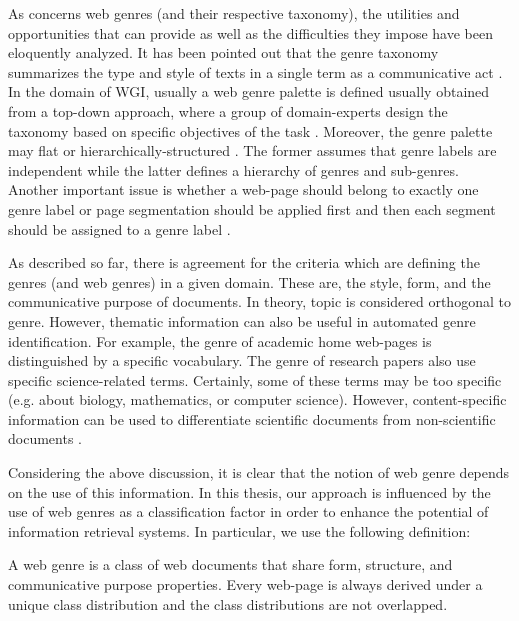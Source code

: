 As concerns web genres (and their respective taxonomy), the utilities and opportunities that can provide as well as the difficulties they impose have been eloquently analyzed. It has been pointed out that the genre taxonomy summarizes the type and style of texts in a single term as a communicative act \parencite{de2009genre}. In the domain of WGI, usually a web genre palette is defined usually obtained from a top-down approach, where a group of domain-experts design the taxonomy based on specific objectives of the task \parencite{crowston2011problems}. Moreover, the genre palette may flat or hierarchically-structured \parencite{wu2010fine}. The former assumes that genre labels are independent while the latter defines a hierarchy of genres and sub-genres. Another important issue is whether a web-page should belong to exactly one genre label or page segmentation should be applied first and then each segment should be assigned to a genre label  \parencite{madjarov2015web,jebari2015combination}. 

As described so far, there is agreement for the criteria which are defining the genres (and web genres) in a given domain. These are, the style, form, and the communicative purpose of documents. In theory, topic is considered orthogonal to genre. However, thematic information can also be useful in automated genre identification. For example, the genre of academic home web-pages is distinguished by a specific vocabulary. The genre of research papers also use specific science-related terms. Certainly, some of these terms may be too specific (e.g. about biology, mathematics, or computer science). However, content-specific information can be used to differentiate scientific documents from non-scientific documents \parencite{coutinho2009describe,crowston2011problems,kanaris2009learning,jebari2015combination,gollapalli2011identifying}. 

Considering the above discussion, it is clear that the notion of web genre depends on the use of this information. In this thesis, our approach is influenced by the use of web genres as a classification factor in order to enhance the potential of information retrieval systems. In particular, we use the following definition:

\begin{definition} A web genre is a class of web documents that share form, structure, and communicative purpose properties. Every web-page is always derived under a unique class distribution and the class distributions are not overlapped.
\end{definition}

